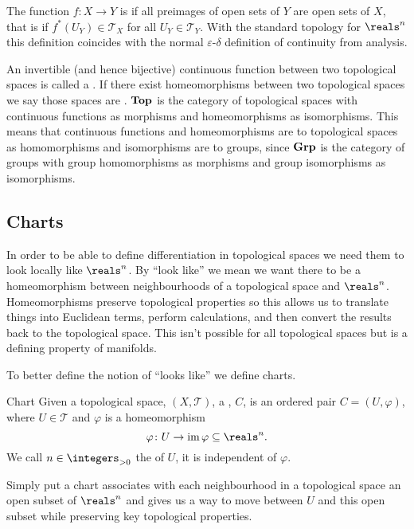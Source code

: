The function \(f \colon X \to Y\) is  if all preimages of open sets of \(Y\) are open sets of \(X\), that is if \(f^*(U_Y) \in \mathcal{T}_X\) for all \(U_Y \in \mathcal{T}_Y\).
With the standard topology for \(\reals^n\) this definition coincides with the normal \(\varepsilon\)-\(\delta\) definition of continuity from analysis.

An invertible (and hence bijective) continuous function between two topological spaces is called a .
If there exist homeomorphisms between two topological spaces we say those spaces are .
\(\mathbf{Top}\) is the category of topological spaces with continuous functions as morphisms and homeomorphisms as isomorphisms.
This means that continuous functions and homeomorphisms are to topological spaces as homomorphisms and isomorphisms are to groups, since \(\mathbf{Grp}\) is the category of groups with group homomorphisms as morphisms and group isomorphisms as isomorphisms.

\subsection{Charts}
In order to be able to define differentiation in topological spaces we need them to look locally like \(\reals^n\).
By \enquote{look like} we mean we want there to be a homeomorphism between neighbourhoods of a topological space and \(\reals^n\).
Homeomorphisms preserve topological properties so this allows us to translate things into Euclidean terms, perform calculations, and then convert the results back to the topological space.
This isn't possible for all topological spaces but is a defining property of manifolds.

To better define the notion of \enquote{looks like} we define charts.

\begin{dfn}{Chart}{}
    Given a topological space, \((X, \mathcal{T})\), a , \(C\), is an ordered pair \(C = (U, \varphi)\), where \(U \in \mathcal{T}\) and \(\varphi\) is a homeomorphism
    \begin{equation}
        \varphi \colon U \to \mathop{\mathrm{im}}\varphi \subseteq \reals^n.
    \end{equation}
    We call \(n \in \integers_{>0}\) the  of \(U\), it is independent of \(\varphi\).
\end{dfn}

Simply put a chart associates with each neighbourhood in a topological space an open subset of \(\reals^n\) and gives us a way to move between \(U\) and this open subset while preserving key topological properties.

